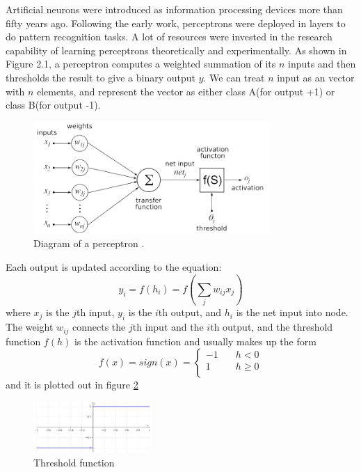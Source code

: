 Artificial neurons were introduced as information processing devices more than fifty years ago\citep{mcculloch1943logical}. Following the early work, perceptrons were deployed in layers to do pattern recognition tasks. A lot of resources were invested in the research capability of learning perceptrons theoretically and experimentally. As shown in Figure 2.1, a perceptron computes a weighted summation of its $n$ inputs and then thresholds the result to give a binary output $y$. We can treat $n$ input as an vector with $n$ elements, and represent the vector as either class A(for output +1) or class B(for output -1).
\graphicspath{ {./Figures/} }
\begin{figure}[!htb]
\centering
\includegraphics[width=0.8\textwidth]{Figure2-1.png}
\caption{\label{fig:perceptron}Diagram of a perceptron \citep{NeuronFigure1}.}
\end{figure}

Each output is updated according to the equation:
\begin{equation}\label{eq:BasicEq}
y_{i} = f(h_{i}) = f\left(\sum_{j}w_{ij}x_{j}\right)
\end{equation}
where $x_{j}$ is the $j$th input, $y_{i}$ is the $i$th output, and $h_{i}$ is the net input into node. The weight $w_{ij}$ connects the $j$th input and the $i$th output, and the threshold function $f(h)$ is the activation function and usually makes up the form
\begin{equation}\label{eq:FullEq}
f(x) = sign(x) = 
  \begin{cases}
    -1       & \quad h < 0 \\
    1  & \quad h \geq 0\\
  \end{cases}
\end{equation}
and it is plotted out in figure \ref{fig:ThresholdFunc}
\graphicspath{ {./Figures/} }
\begin{figure}[!htb]
\centering
\includegraphics[width=0.4\textwidth]{ThresholdFunc.jpeg}
\caption{\label{fig:ThresholdFunc}Threshold function}
\end{figure}

